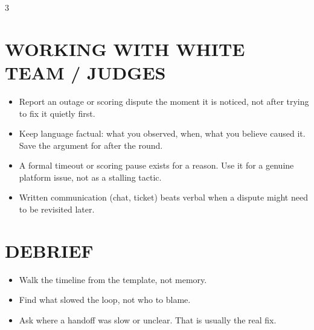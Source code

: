 \documentclass[7pt,landscape]{article}
\begin{document}
\begin{multicols*}{3}
\section{WORKING WITH WHITE TEAM / JUDGES}
\begin{itemize}
    \item Report an outage or scoring dispute the moment it is noticed, not after trying to fix it quietly first.
    \item Keep language factual: what you observed, when, what you believe caused it. Save the argument for after the round.
    \item A formal timeout or scoring pause exists for a reason. Use it for a genuine platform issue, not as a stalling tactic.
    \item Written communication (chat, ticket) beats verbal when a dispute might need to be revisited later.
\end{itemize}

\section{DEBRIEF}
\begin{itemize}
    \item Walk the timeline from the template, not memory.
    \item Find what slowed the loop, not who to blame.
    \item Ask where a handoff was slow or unclear. That is usually the real fix.
\end{itemize}

\end{multicols*}
\end{document}
